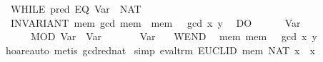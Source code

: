 \begin{isabellebody}
\ \ WHILE\ {}{}pred\ {}EQ\ {}Var\ {}{}\ {}NAT\ {}{}{}{}\isanewline
\ \ INVARIANT\ {}mem{}\ gcd\ {}mem\ {}{}\ {}mem\ {}{}\ {}\ gcd\ x\ y{}\isanewline
\ \ DO\isanewline
\ \ \ \ {}\ {}{}\ Var\ {}{}\isanewline
\ \ \ \ {}\ {}{}\ MOD\ {}Var\ {}{}\ {}Var\ {}{}{}\isanewline
\ \ \ \ {}\ {}{}\ Var\ {}\isanewline
\ \ WEND\isanewline
\ \ {}{}mem{}\ mem\ {}\ {}\ gcd\ x\ y{}{}{}\isanewline
%
\isadelimproof
\ \ %
\endisadelimproof
%
\isatagproof
{}\isamarkupfalse%
\ hoare{}auto\ {}metis\ gcd{}red{}nat{}%
\endisatagproof
{\isafoldproof}%
%
\isadelimproof
\isanewline
%
\endisadelimproof
\isanewline
{}\isamarkupfalse%
\ {}simp{}{}\ {}eval{}trm\ EUCLID\ mem\ {}NAT\ x{}\ {}\ x{}\isanewline
%
\isadelimproof
\ \ %
\endisadelimproof
%
\isatagproof

\end{isabellebody}
